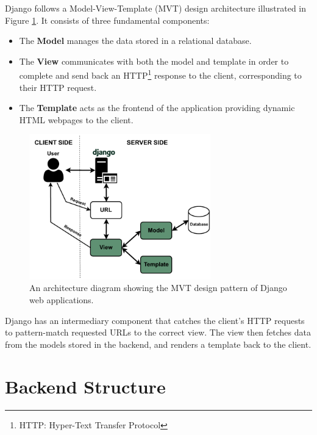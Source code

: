 \documentclass{l4proj}
\begin{document}
Django follows a Model-View-Template (MVT) design architecture illustrated in Figure \ref{fig:django_architecture}. It consists of three fundamental components:
\begin{itemize}
    \item The \textbf{Model} manages the data stored in a relational database.
    \item The \textbf{View} communicates with both the model and template in order to complete and send back an HTTP\footnote{HTTP: Hyper-Text Transfer Protocol} response to the client, corresponding to their HTTP request.
    \item The \textbf{Template} acts as the frontend of the application providing dynamic HTML webpages to the client.
\end{itemize}

\begin{figure}
    \centering
    \includegraphics[width=0.7\textwidth]{figures/django_architecture.pdf}
    \caption{An architecture diagram showing the MVT design pattern of Django web applications.}
    \label{fig:django_architecture}
\end{figure}

Django has an intermediary component that catches the client's HTTP requests to pattern-match requested URLs to the correct view. The view then fetches data from the models stored in the backend, and renders a template back to the client.


\section{Backend Structure}
\end{document}
